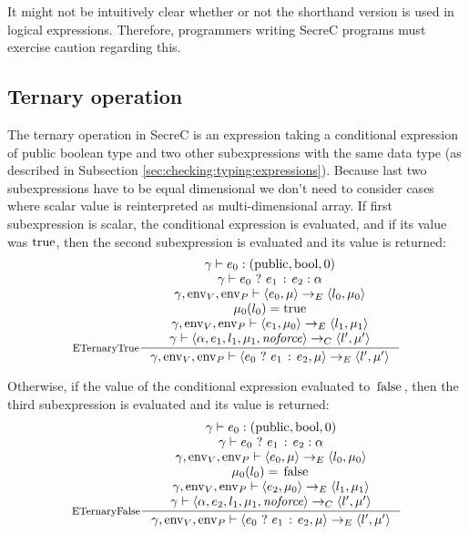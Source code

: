 \documentclass[a4paper, 10pt, draft]{report}
\DeclareMathOperator*{\env}{env}
\DeclareMathOperator*{\noforce}{\mathit{noforce}}
\newcommand{\mycode}[1]{\ensuremath{\mbox{\lstinline{#1}}}}
\begin{document}
It might not be intuitively clear whether or not the shorthand version is used
in logical expressions. Therefore, programmers writing SecreC programs must
exercise caution regarding this.

\subsection{Ternary operation}\label{sec:semantics:expr:ternary}

The ternary operation in SecreC is an expression taking a conditional
expression of public boolean type and two other subexpressions with the same
data type (as described in Subsection \ref{sec:checking:typing:expressions}).
Because last two subexpressions have to be equal dimensional we don't need to consider
cases where scalar value is reinterpreted as multi-dimensional array. If first
subexpression is scalar, the conditional expression is evaluated, and if its
value was \mycode{true}, then the second subexpression is evaluated and its
value is returned:
\[\inference[ETernaryTrue]{
  \gamma |- e_0 : \left( \mycode{public}, \mycode{bool}, 0 \right) \\
  \gamma |- e_0\ \mycode{?}\ e_1\ \mycode{:}\ e_2 : \alpha \\
  \gamma, \env_V, \env_P |- \left<e_0, \mu \right> \to_E \left< l_0, \mu_0 \right> \\
  \mu_0(l_0) = \mycode{true}\\
  \gamma, \env_V, \env_P |- \left< e_1, \mu_0 \right> \to_E \left< l_1, \mu_1 \right> \\
  \gamma |- \left< \alpha, e_1, l_1, \mu_1, \noforce \right> \to_C \left< l', \mu' \right>
}{
  \gamma, \env_V, \env_P |- \left< e_0\ \mycode{?}\ e_1\ \mycode{:}\ e_2, \mu \right> \to_E \left< l', \mu' \right>
}\]

Otherwise, if the value of the conditional expression evaluated to
\mycode{false}, then the third subexpression is evaluated and its value is
returned:
\[\inference[ETernaryFalse]{
  \gamma |- e_0 : \left( \mycode{public}, \mycode{bool}, 0 \right) \\
  \gamma |- e_0\ \mycode{?}\ e_1\ \mycode{:}\ e_2 : \alpha \\
  \gamma, \env_V, \env_P |- \left<e_0, \mu \right> \to_E \left< l_0, \mu_0 \right> \\
  \mu_0(l_0) = \mycode{false}\\
  \gamma, \env_V, \env_P |- \left< e_2, \mu_0 \right> \to_E \left< l_1, \mu_1 \right> \\
  \gamma |- \left< \alpha, e_2, l_1, \mu_1, \noforce \right> \to_C \left< l', \mu' \right>
}{
  \gamma, \env_V, \env_P |- \left< e_0\ \mycode{?}\ e_1\ \mycode{:}\ e_2, \mu \right> \to_E \left< l', \mu' \right>
}\]
\end{document}
